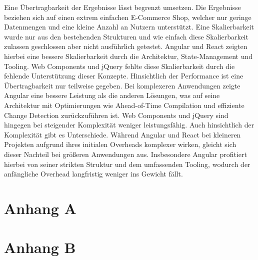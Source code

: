 \documentclass[oneside]{ausarbeitung}
\begin{document}
Eine Übertragbarkeit der Ergebnisse lässt begrenzt umsetzen. Die Ergebnisse beziehen sich auf einen extrem einfachen E-Commerce Shop, welcher nur geringe Datenmengen und eine kleine Anzahl an Nutzern unterstützt. Eine Skalierbarkeit wurde nur aus den bestehenden Strukturen und wie einfach diese Skalierbarkeit zulassen geschlossen aber nicht ausführlich getestet. 
Angular und React zeigten hierbei eine bessere Skalierbarkeit durch die Architektur, State-Management und Tooling. Web Components und jQuery fehlte diese Skalierbarkeit durch die fehlende Unterstützung dieser Konzepte. Hinsichtlich der Performance ist eine Übertragbarkeit nur teilweise gegeben. Bei komplexeren Anwendungen zeigte Angular eine bessere Leistung als die anderen Lösungen, was auf seine Architektur mit Optimierungen wie Ahead-of-Time Compilation und effiziente Change Detection zurückzuführen ist. Web Components und jQuery sind hingegen bei steigender Komplexität weniger leistungsfähig. 
Auch hinsichtlich der Komplexität gibt es Unterschiede. Während Angular und React bei kleineren Projekten aufgrund ihres initialen Overheads komplexer wirken, gleicht sich dieser Nachteil bei größeren Anwendungen aus. Insbesondere Angular profitiert hierbei von seiner strikten Struktur und dem umfassenden Tooling, wodurch der anfängliche Overhead langfristig weniger ins Gewicht fällt.

\appendix

\printbibliography

\chapter{Anhang A}

\chapter{Anhang B}
\end{document}
